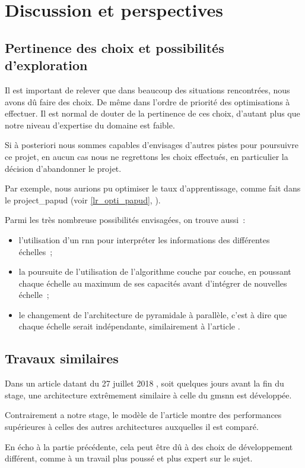 \section{Discussion et perspectives}
\subsection{Pertinence des choix et possibilités d'exploration}
Il est important de relever que dans beaucoup des situations rencontrées, nous avons dû faire des choix. De même dans l'ordre de priorité des optimisations à effectuer. 
Il est normal de douter de la pertinence de ces choix, d'autant plus que notre niveau d'expertise du domaine est faible.

Si à posteriori nous sommes capables d'envisages d'autres pistes pour poursuivre ce projet, en aucun cas nous ne regrettons les choix effectués, en particulier la décision d'abandonner le projet.

Par exemple, nous aurions pu optimiser le taux d'apprentissage, comme fait dans le \gls{project_papud} (voir \autoref{lr_opti_papud}, ).

Parmi les très nombreuse possibilités envisagées, on trouve aussi~:
\begin{itemize}
	\item l'utilisation d'un \gls{rnn} pour interpréter les informations des différentes échelles~;
	\item la poursuite de l'utilisation de l'algorithme couche par couche, en poussant chaque échelle au maximum de ses capacités avant d'intégrer de nouvelles échelle~;
	\item le changement de l'architecture de pyramidale à parallèle, c'est à dire que chaque échelle serait indépendante, similairement à l'article \autocite{Xiao2018Jan}.
\end{itemize}

\subsection{Travaux similaires}
Dans un article datant du 27 juillet 2018 \autocite{hierachical_rnn}, soit quelques jours avant la fin du stage, une architecture extrêmement similaire à celle du \gls{gmsnn} est développée.

Contrairement a notre stage, le modèle de l'article montre des performances supérieures à celles des autres architectures auxquelles il est comparé.

En écho à la partie précédente, cela peut être dû à des choix de développement différent, comme à un travail plus poussé et plus expert sur le sujet.
